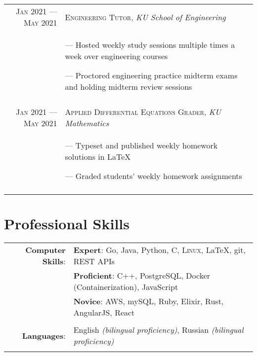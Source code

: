 \documentclass[a4paper, 10pt]{article}
\begin{document}
\begin{tabular}{r|p{12cm}}
	\textsc{Jan 2021 --- May 2021} & \textsc{Engineering Tutor}, \emph{KU School of Engineering}           \\&\footnotesize{
		--- Hosted weekly study sessions multiple times a week over engineering courses

		--- Proctored engineering practice midterm exams and holding midterm review sessions
	}                                                                                                      \\\multicolumn{2}{c}{}\\

	\textsc{Jan 2021 --- May 2021} & \textsc{Applied Differential Equations Grader}, \emph{KU Mathematics} \\&\footnotesize{
		--- Typeset and published weekly homework solutions in \LaTeX

		--- Graded students' weekly homework assignments
	}                                                                                                      \\\multicolumn{2}{c}{}\\
\end{tabular}

\section{Professional Skills}

\begin{tabular}{rl}
	\textbf{Computer Skills}: &
	\textbf{Expert}: Go, Java, Python, C, \textsc{Linux}, \LaTeX, git, REST APIs                               \\&
	\textbf{Proficient}: C++, PostgreSQL, Docker (Containerization), JavaScript                                \\&
	\textbf{Novice}: AWS, mySQL, Ruby, Elixir, Rust, AngularJS, React                                          \\\\
	\textbf{Languages}:       & English \emph{(bilingual proficiency)}, Russian \emph{(bilingual proficiency)} \\\\
\end{tabular}
\end{document}
